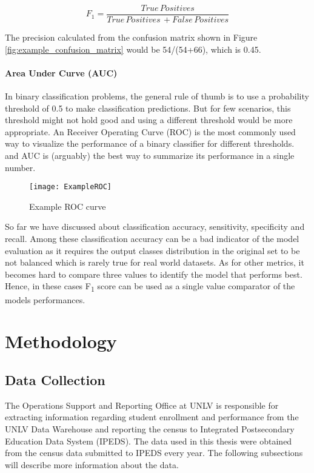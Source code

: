\documentclass[11pt,openright]{report}
\begin{document}
\begin{equation}
F_{1} = \dfrac{True\, Positives }{True\, Positives\, + False\, Positives} \label{eq:Precision} 
 \end{equation}

The precision calculated from the confusion matrix shown in Figure \ref{fig:example_confusion_matrix} would be 54/(54+66), which is 0.45.


\subsubsection{Area Under Curve (AUC)}

In binary classification problems, the general rule of thumb is to use a probability threshold of 0.5 to make classification predictions. But for few scenarios, this threshold might not hold good and using a different threshold would be more appropriate. An Receiver Operating Curve (ROC) is the most commonly used way to visualize the performance of a binary classifier for different thresholds. and AUC is (arguably) the best way to summarize its performance in a single number.

  \begin{figure}[!htbp]
	\centering
	\texttt{[image: ExampleROC]}
	\caption{Example ROC curve}
	\label{fig:example_roc}
\end{figure} 

So far we have discussed about classification accuracy, sensitivity, specificity and recall. Among these classification accuracy can be a bad indicator of the model evaluation as it requires the output classes distribution in the original set to be not balanced which is rarely true for real world datasets. As for other metrics, it becomes hard to compare three values to identify the model that performs best. Hence, in these cases F\textsubscript1 score can be used as a single value comparator of the models performances.




\chapter{Methodology} \label{chapter:methodology}
\section{Data Collection}

The Operations Support and Reporting Office at UNLV is responsible for extracting information regarding student enrollment and performance from the UNLV Data Warehouse and reporting the census to Integrated Postsecondary Education Data System (IPEDS). The data used in this thesis were obtained from the census data submitted to IPEDS every year. The following subsections will describe more information about the data.
\end{document}
